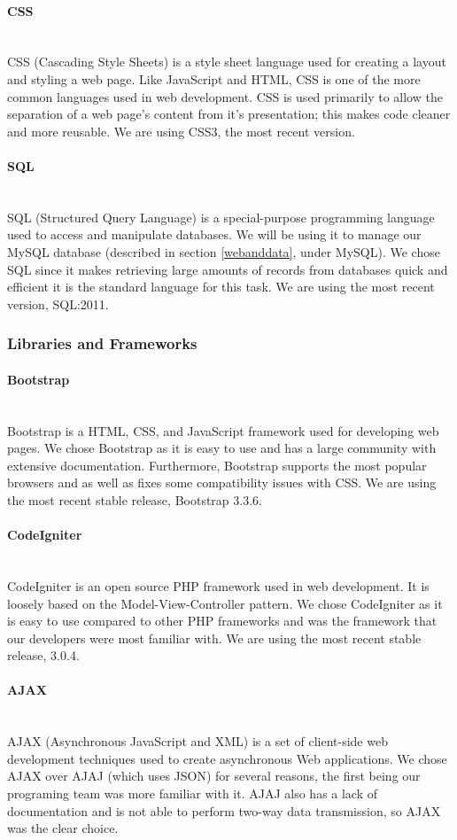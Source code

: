 \documentclass[12pt]{article}
\begin{document}
\paragraph*{CSS}~\\
CSS (Cascading Style Sheets) is a style sheet language used for creating a layout and styling a web page. Like JavaScript and HTML, CSS is one of the more common languages used in web development. CSS is used primarily to allow the separation of a web page's content from it's presentation; this makes code cleaner and more reusable. We are using CSS3, the most recent version.
%
\paragraph*{SQL}~\\
SQL (Structured Query Language) is a special-purpose programming language used to access and manipulate databases. We will be using it to manage our MySQL database (described in section \ref{webanddata}, under MySQL). We chose SQL since it makes retrieving large amounts of records from databases quick and efficient it is the standard language for this task. We are using the most recent version, SQL:2011.
%
%
%
\subsubsection{Libraries and Frameworks}\label{framworks}
\paragraph*{Bootstrap}~\\
Bootstrap is a HTML, CSS, and JavaScript framework used for developing web pages. We chose Bootstrap as it is easy to use and has a large community with extensive documentation. Furthermore, Bootstrap supports the most popular browsers and as well as fixes some compatibility issues with CSS. We are using the most recent stable release, Bootstrap 3.3.6.
%
\paragraph*{CodeIgniter}~\\
CodeIgniter is an open source PHP framework used in web development. It is loosely based on the Model-View-Controller pattern. We chose CodeIgniter as it is easy to use compared to other PHP frameworks and was the framework that our developers were most familiar with. We are using the most recent stable release, 3.0.4.
%
\paragraph*{AJAX}~\\
AJAX (Asynchronous JavaScript and XML) is a set of client-side web development techniques used to create asynchronous Web applications. We chose AJAX over AJAJ (which uses JSON) for several reasons, the first being our programing team was more familiar with it. AJAJ also has a lack of documentation and is not able to perform two-way data transmission, so AJAX was the clear choice.
%
\end{document}
